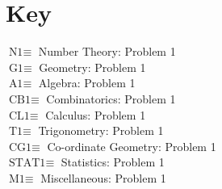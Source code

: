 

\section{Key}
$\text{N1}\equiv$ Number Theory: Problem 1\\
$\text{G1}\equiv$ Geometry: Problem 1\\
$\text{A1}\equiv$ Algebra: Problem 1\\
$\text{CB1}\equiv$ Combinatorics: Problem 1\\
$\text{CL1}\equiv$ Calculus: Problem 1\\
$\text{T1}\equiv$ Trigonometry: Problem 1\\
$\text{CG1}\equiv$ Co-ordinate Geometry: Problem 1\\
$\text{STAT1}\equiv$ Statistics: Problem 1\\
$\text{M1}\equiv$ Miscellaneous: Problem 1\\
